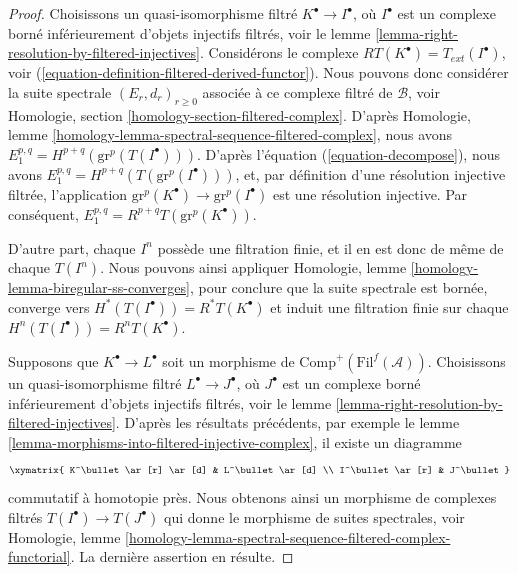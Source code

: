 \begin{proof}
Choisissons un quasi-isomorphisme filtré $K^\bullet \to I^\bullet$, où
$I^\bullet$ est un complexe borné inférieurement d'objets injectifs filtrés,
voir le lemme \ref{lemma-right-resolution-by-filtered-injectives}.
Considérons le complexe $RT(K^\bullet) = T_{ext}(I^\bullet)$, voir
(\ref{equation-definition-filtered-derived-functor}).
Nous pouvons donc considérer la suite spectrale
$(E_r, d_r)_{r \geq 0}$ associée à ce complexe filtré de $\mathcal{B}$, voir
Homologie, section \ref{homology-section-filtered-complex}.
D'après Homologie, lemme
\ref{homology-lemma-spectral-sequence-filtered-complex}, nous avons
$E_1^{p, q} = H^{p + q}(\text{gr}^p(T(I^\bullet)))$.
D'après l'équation (\ref{equation-decompose}), nous avons
$E_1^{p, q} = H^{p + q}(T(\text{gr}^p(I^\bullet)))$, et, par définition d'une
résolution injective filtrée, l'application
$\text{gr}^p(K^\bullet) \to \text{gr}^p(I^\bullet)$ est une résolution
injective. Par conséquent,
$E_1^{p, q} = R^{p + q}T(\text{gr}^p(K^\bullet))$.

\medskip\noindent
D'autre part, chaque $I^n$ possède une filtration finie, et il en est donc de
même de chaque $T(I^n)$. Nous pouvons ainsi appliquer Homologie, lemme
\ref{homology-lemma-biregular-ss-converges}, pour conclure que la suite
spectrale est bornée, converge vers
$H^*(T(I^\bullet)) = R^*T(K^\bullet)$ et induit une filtration finie sur
chaque $H^n(T(I^\bullet)) = R^nT(K^\bullet)$.

\medskip\noindent
Supposons que $K^\bullet \to L^\bullet$ soit un morphisme de
$\text{Comp}^{+}(\text{Fil}^f(\mathcal{A}))$.
Choisissons un quasi-isomorphisme filtré $L^\bullet \to J^\bullet$, où
$J^\bullet$ est un complexe borné inférieurement d'objets injectifs filtrés,
voir le lemme \ref{lemma-right-resolution-by-filtered-injectives}.
D'après les résultats précédents, par exemple le
lemme \ref{lemma-morphisms-into-filtered-injective-complex}, il existe un
diagramme
$$
\xymatrix{
K^\bullet \ar[r] \ar[d] & L^\bullet \ar[d] \\
I^\bullet \ar[r] & J^\bullet
}
$$
commutatif à homotopie près. Nous obtenons ainsi un morphisme de complexes
filtrés $T(I^\bullet) \to T(J^\bullet)$ qui donne le morphisme de suites
spectrales, voir Homologie, lemme
\ref{homology-lemma-spectral-sequence-filtered-complex-functorial}.
La dernière assertion en résulte.
\end{proof}

